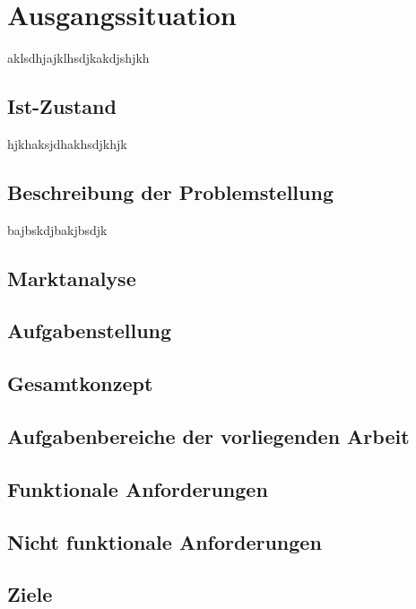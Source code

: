 \section{Ausgangssituation}
aklsdhjajklhsdjkakdjshjkh


\begin{spacing}{1}
\section{Ist-Zustand}
\end{spacing}
hjkhaksjdhakhsdjkhjk


\begin{spacing}{1}
\section{Beschreibung der Problemstellung}
\end{spacing}
bajbskdjbakjbsdjk
   

\begin{spacing}{1}
\section{Marktanalyse}
\end{spacing}

\begin{spacing}{1}
\section{Aufgabenstellung}
\end{spacing}
                
\begin{spacing}{2}
\subsection{Gesamtkonzept}
\end{spacing}

\begin{spacing}{2}
\subsection{Aufgabenbereiche der vorliegenden Arbeit}
\end{spacing}

\begin{spacing}{2}
\subsection{Funktionale Anforderungen}
\end{spacing}

\begin{spacing}{2}
\subsection{Nicht funktionale Anforderungen}
\end{spacing}

\begin{spacing}{2}
\section{Ziele}
\end{spacing}
    
